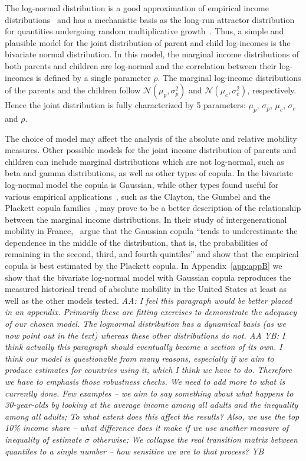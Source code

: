 \documentclass[12pt,a4paper]{article}
\newcommand{\red}[1]{{\color{red} #1}}
\newcommand{\blue}[1]{{\color{blue} #1}}
\newcommand{\AAA}[1]{\red{{\it AA: #1 AA}}}
\newcommand{\YB}[1]{\blue{{\it YB: #1 YB}}}
\numberwithin{equation}{section}
\begin{document}
The log-normal distribution is a good approximation of empirical income distributions~\citep{pinkovskiy2009parametric} and has a mechanistic basis as the long-run attractor distribution for quantities undergoing random multiplicative growth~\cite{aitchison1957,adamou2016}. Thus, a simple and plausible model for the joint distribution of parent and child log-incomes is the bivariate normal distribution. In this model, the marginal income distributions of both parents and children are log-normal and the correlation between their log-incomes is defined by a single parameter $\rho$. The marginal log-income distributions of the parents and the children follow $\mathcal{N}\left(\mu_p,\sigma_p^2\right)$ and $\mathcal{N}\left(\mu_c,\sigma_c^2\right)$, respectively. Hence the joint distribution is fully characterized by 5 parameters: $\mu_p$, $\sigma_p$, $\mu_c$, $\sigma_c$ and $\rho$.

The choice of model may affect the analysis of the absolute and relative mobility measures. Other possible models for the joint income distribution of parents and children can include marginal distributions which are not log-normal, such as beta and gamma distributions, as well as other types of copula. In the bivariate log-normal model the copula is Gaussian, while other types found useful for various empirical applications~\citep{trivedi2007copula}, such as the Clayton, the Gumbel and the Plackett copula families~\citep{bonhomme2009assessing}, may prove to be a better description of the relationship between the marginal income distributions. In their study of intergenerational mobility in France,~\citet{bonhomme2009assessing} argue that the Gaussian copula ``tends to underestimate the dependence in the middle of the distribution, that is, the probabilities of remaining in the second, third, and fourth quintiles'' and show that the empirical copula is best estimated by the Plackett copula. In Appendix~\ref{app:appB} we show that the bivariate log-normal model with Gaussian copula reproduces the measured historical trend of absolute mobility in the United States at least as well as the other models tested. \AAA{I feel this paragraph would be better placed in an appendix. Primarily these are fitting exercises to demonstrate the adequacy of our chosen model. The lognormal distribution has a dynamical basis (as we now point out in the text) whereas these other distributions do not.} \YB{I think actually this paragraph should eventually become a section of its own. I think our model is questionable from many reasons, especially if we aim to produce estimates for countries using it, which I think we have to do. Therefore we have to emphasis those robustness checks. We need to add more to what is currently done. Few examples -- we aim to say something about what happens to 30-year-olds by looking at the average income among all adults and the inequality among all adults; To what extent does this affect the results? Also, we use the top 10\% income share -- what difference does it make if we use another measure of inequality of estimate $\sigma$ otherwise; We collapse the real transition matrix between quantiles to a single number -- how sensitive we are to that process?}
\end{document}
